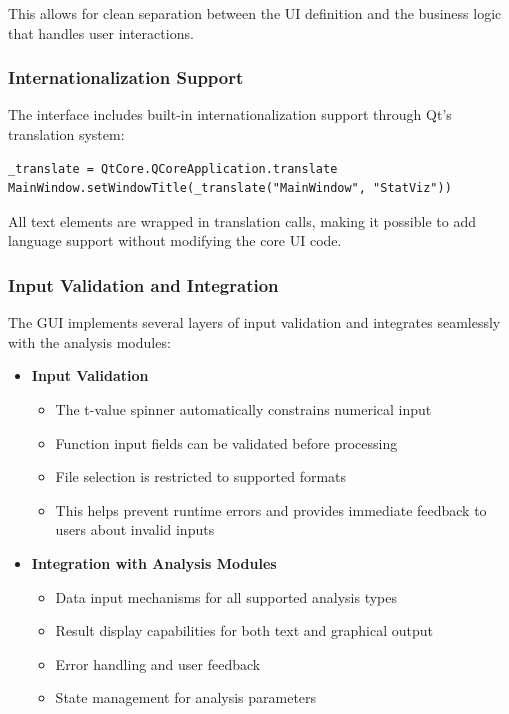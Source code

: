 \documentclass{article}
\begin{document}
This allows for clean separation between the UI definition and the business logic that handles user interactions.

\subsubsection{Internationalization Support}

The interface includes built-in internationalization support through Qt's translation system:

\begin{verbatim}
_translate = QtCore.QCoreApplication.translate
MainWindow.setWindowTitle(_translate("MainWindow", "StatViz"))
\end{verbatim}

All text elements are wrapped in translation calls, making it possible to add language support without modifying the core UI code.

\subsubsection{Input Validation and Integration}

The GUI implements several layers of input validation and integrates seamlessly with the analysis modules:

\begin{itemize}
    \item \textbf{Input Validation}
    \begin{itemize}
        \item The t-value spinner automatically constrains numerical input
        \item Function input fields can be validated before processing
        \item File selection is restricted to supported formats
        \item This helps prevent runtime errors and provides immediate feedback to users about invalid inputs
    \end{itemize}
    
    \item \textbf{Integration with Analysis Modules}
    \begin{itemize}
        \item Data input mechanisms for all supported analysis types
        \item Result display capabilities for both text and graphical output
        \item Error handling and user feedback
        \item State management for analysis parameters
    \end{itemize}
\end{itemize}
\end{document}
